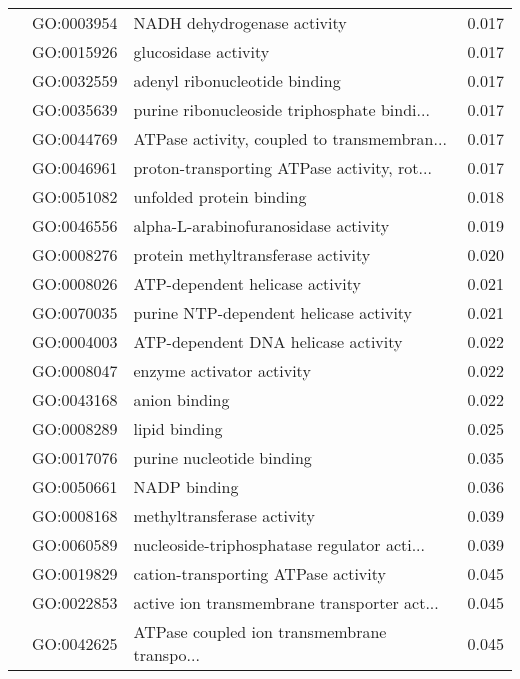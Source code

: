 \begin{longtable}{lllr}
   & GO:0003954 &                  NADH dehydrogenase activity &         0.017 \\
   & GO:0015926 &                         glucosidase activity &         0.017 \\
   & GO:0032559 &                adenyl ribonucleotide binding &         0.017 \\
   & GO:0035639 &  purine ribonucleoside triphosphate bindi... &         0.017 \\
   & GO:0044769 &  ATPase activity, coupled to transmembran... &         0.017 \\
   & GO:0046961 &  proton-transporting ATPase activity, rot... &         0.017 \\
   & GO:0051082 &                     unfolded protein binding &         0.018 \\
   & GO:0046556 &         alpha-L-arabinofuranosidase activity &         0.019 \\
   & GO:0008276 &           protein methyltransferase activity &         0.020 \\
   & GO:0008026 &              ATP-dependent helicase activity &         0.021 \\
   & GO:0070035 &       purine NTP-dependent helicase activity &         0.021 \\
   & GO:0004003 &          ATP-dependent DNA helicase activity &         0.022 \\
   & GO:0008047 &                    enzyme activator activity &         0.022 \\
   & GO:0043168 &                                anion binding &         0.022 \\
   & GO:0008289 &                                lipid binding &         0.025 \\
   & GO:0017076 &                    purine nucleotide binding &         0.035 \\
   & GO:0050661 &                                 NADP binding &         0.036 \\
   & GO:0008168 &                   methyltransferase activity &         0.039 \\
   & GO:0060589 &  nucleoside-triphosphatase regulator acti... &         0.039 \\
   & GO:0019829 &          cation-transporting ATPase activity &         0.045 \\
   & GO:0022853 &  active ion transmembrane transporter act... &         0.045 \\
   & GO:0042625 &  ATPase coupled ion transmembrane transpo... &         0.045 \\

\end{longtable}
